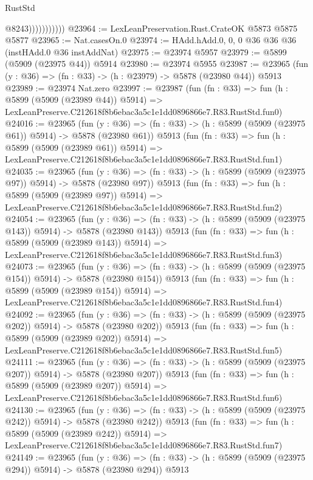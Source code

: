 \begin{lexlean}{RustStd}
\begin{coremodule}
{{                          @8243)))))))))))
@23964 := LexLeanPreservation.Rust.CrateOK @5873 @5875 @5877
@23965 := Nat.casesOn.{0}
@23974 := HAdd.hAdd.{0, 0, 0} @36 @36 @36 (instHAdd.{0} @36 instAddNat)
@23975 := @23974 @5957
@23979 := @5899 (@5909 (@23975 @44)) @5914
@23980 := @23974 @5955
@23987 := @23965 (fun (y : @36) => (fn : @33) -> (h : @23979) -> @5878 (@23980 @44)) @5913
@23989 := @23974 Nat.zero
@23997 := @23987
    (fun (fn : @33) =>
    fun (h : @5899 (@5909 (@23989 @44)) @5914) =>
    LexLeanPreserve.C212618f8b6ebac3a5c1e1dd0896866e7.R83.RustStd.fun0)
@24016 := @23965
    (fun (y : @36) => (fn : @33) -> (h : @5899 (@5909 (@23975 @61)) @5914) -> @5878 (@23980 @61))
    @5913
    (fun (fn : @33) =>
    fun (h : @5899 (@5909 (@23989 @61)) @5914) =>
    LexLeanPreserve.C212618f8b6ebac3a5c1e1dd0896866e7.R83.RustStd.fun1)
@24035 := @23965
    (fun (y : @36) => (fn : @33) -> (h : @5899 (@5909 (@23975 @97)) @5914) -> @5878 (@23980 @97))
    @5913
    (fun (fn : @33) =>
    fun (h : @5899 (@5909 (@23989 @97)) @5914) =>
    LexLeanPreserve.C212618f8b6ebac3a5c1e1dd0896866e7.R83.RustStd.fun2)
@24054 := @23965
    (fun (y : @36) => (fn : @33) -> (h : @5899 (@5909 (@23975 @143)) @5914) -> @5878 (@23980 @143))
    @5913
    (fun (fn : @33) =>
    fun (h : @5899 (@5909 (@23989 @143)) @5914) =>
    LexLeanPreserve.C212618f8b6ebac3a5c1e1dd0896866e7.R83.RustStd.fun3)
@24073 := @23965
    (fun (y : @36) => (fn : @33) -> (h : @5899 (@5909 (@23975 @154)) @5914) -> @5878 (@23980 @154))
    @5913
    (fun (fn : @33) =>
    fun (h : @5899 (@5909 (@23989 @154)) @5914) =>
    LexLeanPreserve.C212618f8b6ebac3a5c1e1dd0896866e7.R83.RustStd.fun4)
@24092 := @23965
    (fun (y : @36) => (fn : @33) -> (h : @5899 (@5909 (@23975 @202)) @5914) -> @5878 (@23980 @202))
    @5913
    (fun (fn : @33) =>
    fun (h : @5899 (@5909 (@23989 @202)) @5914) =>
    LexLeanPreserve.C212618f8b6ebac3a5c1e1dd0896866e7.R83.RustStd.fun5)
@24111 := @23965
    (fun (y : @36) => (fn : @33) -> (h : @5899 (@5909 (@23975 @207)) @5914) -> @5878 (@23980 @207))
    @5913
    (fun (fn : @33) =>
    fun (h : @5899 (@5909 (@23989 @207)) @5914) =>
    LexLeanPreserve.C212618f8b6ebac3a5c1e1dd0896866e7.R83.RustStd.fun6)
@24130 := @23965
    (fun (y : @36) => (fn : @33) -> (h : @5899 (@5909 (@23975 @242)) @5914) -> @5878 (@23980 @242))
    @5913
    (fun (fn : @33) =>
    fun (h : @5899 (@5909 (@23989 @242)) @5914) =>
    LexLeanPreserve.C212618f8b6ebac3a5c1e1dd0896866e7.R83.RustStd.fun7)
@24149 := @23965
    (fun (y : @36) => (fn : @33) -> (h : @5899 (@5909 (@23975 @294)) @5914) -> @5878 (@23980 @294))
    @5913
}}
\end{coremodule}
\end{lexlean}
